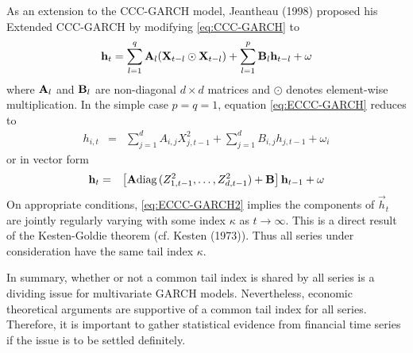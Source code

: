 \documentclass{article}
\begin{document}
As an extension to the CCC-GARCH model, Jeantheau (1998)
\cite{jeantheau1998strong} proposed his Extended CCC-GARCH by
modifying \eqref{eq:CCC-GARCH} to
\begin{equation}
  \label{eq:ECCC-GARCH}
  \mathbf{h}_t =
  \sum_{l=1}^q \mathbf{A}_{l} (\mathbf{X}_{t-l} \odot \mathbf{X}_{t-l})
  +
  \sum_{l=1}^p \mathbf{B}_{l} \mathbf{h}_{t-l}
  +
  \mathbf{\omega}
\end{equation}
where $\mathbf{A}_l$ and $\mathbf{B}_l$ are non-diagonal $d \times d$ matrices
and $\odot$ denotes element-wise multiplication. In the simple case $p=q=1$,
equation \eqref{eq:ECCC-GARCH} reduces to
\begin{eqnarray*}
  h_{i,t} &=&
  \sum_{j=1}^d A_{i,j} X_{j, t-1}^2
  + \sum_{j=1}^d B_{i,j} h_{j, t-1}
  + \omega_i
\end{eqnarray*}
or in vector form
\begin{eqnarray}
  \mathbf{h}_t &=& \left[
    \mathbf{A} \text{diag\,}(Z_{1, t-1}^2, \dots, Z_{d, t-1}^2) + \mathbf{B}
    \right] \mathbf{h}_{t-1} + \mathbf{\omega}
  \label{eq:ECCC-GARCH2}
\end{eqnarray}
On appropriate conditions, \eqref{eq:ECCC-GARCH2} implies the
components of $\vec h_t$ are jointly regularly varying with some index
$\kappa$ as $t \to \infty$. This is a direct result of the Kesten-Goldie
theorem (cf. Kesten (1973)\cite{Kesten1973}). Thus all series under
consideration have the same tail index $\kappa$.

In summary, whether or not a common tail index is shared by all
series is a dividing issue for multivariate GARCH
models. Nevertheless, economic theoretical arguments are supportive of
a common tail index for all series. Therefore, it is important to
gather statistical evidence from financial time series if the issue is
to be settled definitely.
\end{document}
